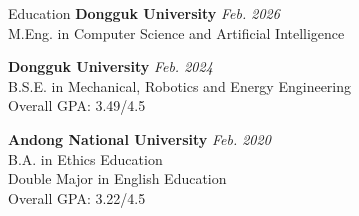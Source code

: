 \begin{rSection}{Education}
  {\bf Dongguk University} \hfill {\em Feb. 2026} \\
  M.Eng. in Computer Science and Artificial Intelligence \\

  \smallskip

  {\bf Dongguk University} \hfill {\em Feb. 2024} \\
  B.S.E. in Mechanical, Robotics and Energy Engineering \\
  Overall GPA: 3.49/4.5

  \smallskip

  {\bf Andong National University} \hfill {\em Feb. 2020} \\
  B.A. in Ethics Education \\
  Double Major in English Education \\
  Overall GPA: 3.22/4.5
\end{rSection}

